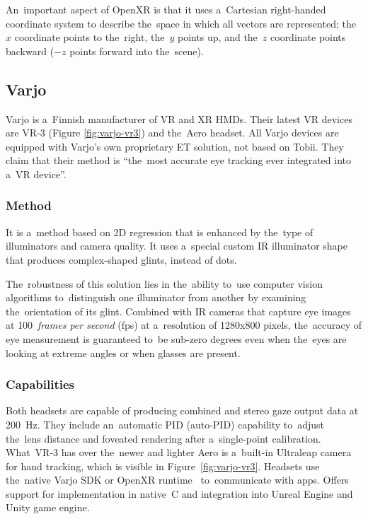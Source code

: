 An~important aspect of OpenXR is that it uses a~Cartesian right-handed coordinate system to describe the~space in which all vectors are represented; the~$x$ coordinate points to the~right, the~$y$ points up, and the~$z$ coordinate points backward ($-z$ points forward into the~scene).~\cite{openxr-coordinate}

\subsection{Varjo}
\label{sec:varjo}

Varjo is a~Finnish manufacturer of VR and XR HMDs. Their latest VR devices are VR-3 (Figure \ref{fig:varjo-vr3}) and the~Aero headset. All Varjo devices are equipped with Varjo's own proprietary ET solution, not based on Tobii. They claim that their method is ``the~most accurate eye tracking ever integrated into a~VR device''.~\cite{varjo-et}

\subsubsection*{Method}
It is a~method based on 2D regression that is enhanced by the~type of illuminators and camera quality. It uses a~special custom IR illuminator shape that produces complex-shaped glints, instead of dots.

The~robustness of this solution lies in the~ability to~use computer vision algorithms to~distinguish one illuminator from another by examining the~orientation of its glint. Combined with IR cameras that capture eye images at 100~\emph{frames per second} (fps) at a~resolution of 1280x800 pixels, the~accuracy of eye measurement is guaranteed to~be sub-zero degrees even when the~eyes are looking at extreme angles or when glasses are present.

\subsubsection*{Capabilities}
Both headsets are capable of producing combined and stereo gaze output data at 200~Hz. They include an~automatic PID (auto-PID) capability to~adjust the~lens distance and foveated rendering after a~single-point calibration. What~VR-3 has over the~newer and lighter Aero is a~built-in Ultraleap camera for hand tracking, which is visible in Figure~\ref{fig:varjo-vr3}. Headsets use the~native Varjo SDK or OpenXR runtime~\cite{varjo-openxr} to~communicate with apps. Offers support for implementation in native~C and integration into Unreal Engine and Unity game engine.~\cite{varjo-vr3, varjo-aero}

